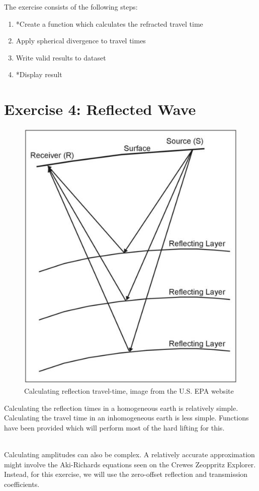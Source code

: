 \documentclass[a4paper, 10pt]{article}
\begin{document}
The exercise consists of the following steps:

\begin{enumerate}
\item *Create a function which calculates the refracted travel time
\item Apply spherical divergence to travel times
\item Write valid results to dataset
\item *Display result
\end{enumerate}

\newpage
\section*{Exercise 4: Reflected Wave}
\begin{figure}[h]
\centering
\includegraphics[scale=2.0]{reflection.jpg}
\caption{Calculating reflection travel-time, image from the U.S. EPA website}
\end{figure}

Calculating the reflection times in a homogeneous earth is relatively simple.  Calculating the travel time in an inhomogeneous earth is less simple.  Functions have been provided which will perform most of the hard lifting for this.
\par~\\
Calculating amplitudes can also be complex.  A relatively accurate approximation might involve the Aki-Richards equations seen on the Crewes Zeoppritz Explorer.  Instead, for this exercise,  we will use the zero-offset reflection and transmission coefficients.
\end{document}
